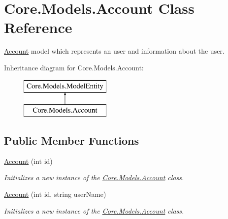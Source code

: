 \hypertarget{classCore_1_1Models_1_1Account}{}\section{Core.\+Models.\+Account Class Reference}
\label{classCore_1_1Models_1_1Account}


\hyperlink{classCore_1_1Models_1_1Account}{Account} model which represents an user and information about the user.  


Inheritance diagram for Core.\+Models.\+Account\+:\begin{figure}[H]
\begin{center}
\leavevmode
\includegraphics[height=2.000000cm]{classCore_1_1Models_1_1Account}
\end{center}
\end{figure}
\subsection*{Public Member Functions}
\begin{DoxyCompactItemize}
\item 
\hyperlink{classCore_1_1Models_1_1Account_a6142601e9f18c6453a95ebde6d8cfec3}{Account} (int id)
\begin{DoxyCompactList}\small\item\em Initializes a new instance of the \hyperlink{classCore_1_1Models_1_1Account}{Core.\+Models.\+Account} class. \end{DoxyCompactList}\item 
\hyperlink{classCore_1_1Models_1_1Account_acb6bb3a9e0def84b5f944891937eb173}{Account} (int id, string user\+Name)
\begin{DoxyCompactList}\small\item\em Initializes a new instance of the \hyperlink{classCore_1_1Models_1_1Account}{Core.\+Models.\+Account} class. \end{DoxyCompactList}\end{DoxyCompactItemize}
